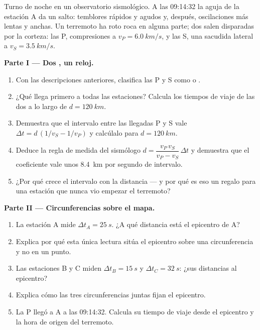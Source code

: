 \begin{problem}
\label{pb:g12:mechanical-waves:1}
Turno de noche en un observatorio sismológico. A las 09:14:32 la aguja
de la estación A da un salto: temblores rápidos y agudos y, después,
oscilaciones más lentas y anchas. Un terremoto ha roto roca en alguna
parte; dos  salen disparadas por la corteza: las  P,
compresiones a $v_P = \qty{6.0}{km/s}$, y las  S, una sacudida
lateral a $v_S = \qty{3.5}{km/s}$.

\medskip
\noindent\textbf{Parte I --- Dos , un reloj.}
\begin{enumerate}
  \item Con las descripciones anteriores, clasifica las  P y S como
         o .
  \item ¿Qué  llega primero a todas las estaciones? Calcula los
        tiempos de viaje de las dos a lo largo de $d = \qty{120}{km}$.
  \item Demuestra que el intervalo entre las llegadas P y S vale
        $\Delta t = d\,(1/v_S - 1/v_P)$ y calcúlalo para
        $d = \qty{120}{km}$.
  \item Deduce la regla de medida del sismólogo
        $d = \dfrac{v_P\,v_S}{v_P - v_S}\,\Delta t$ y demuestra que el
        coeficiente vale unos \qty{8.4}{km} por segundo de intervalo.
  \item ¿Por qué crece el intervalo con la distancia --- y por qué es
        eso un regalo para una estación que nunca vio empezar el
        terremoto?
\end{enumerate}

\medskip
\noindent\textbf{Parte II --- Circunferencias sobre el mapa.}
\begin{enumerate}[resume]
  \item La estación A mide $\Delta t_A = \qty{25}{s}$. ¿A qué distancia
        está el epicentro de A?
  \item Explica por qué esta única lectura sitúa el epicentro sobre una
        circunferencia y no en un punto.
  \item Las estaciones B y C miden $\Delta t_B = \qty{15}{s}$ y
        $\Delta t_C = \qty{32}{s}$: ¿sus distancias al epicentro?
  \item Explica cómo las tres circunferencias juntas fijan el epicentro.
  \item La  P llegó a A a las 09:14:32. Calcula su tiempo de viaje
        desde el epicentro y la hora de origen del terremoto.
\end{enumerate}


\end{problem}
